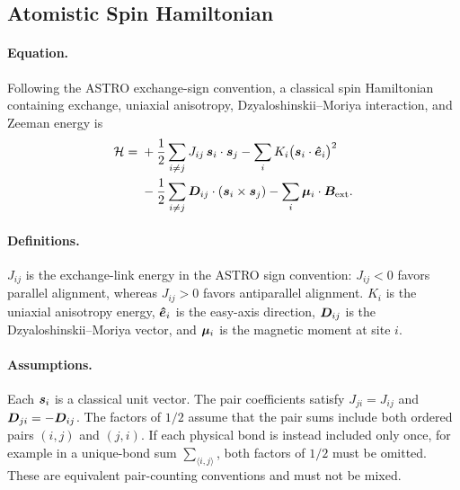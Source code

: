 \subsection{Atomistic Spin Hamiltonian}

\paragraph{Equation.}
Following the ASTRO exchange-sign convention, a classical spin Hamiltonian
containing exchange, uniaxial anisotropy, Dzyaloshinskii--Moriya interaction,
and Zeeman energy is
\begin{align}
    \mathcal{H}
    ={} & +\frac{1}{2}\sum_{i\ne j} J_{ij}\,\bm{s}_i\cdot\bm{s}_j
    -\sum_i K_i\bigl(\bm{s}_i\cdot\bm{\hat{e}}_i\bigr)^2
    \notag                                                      \\
        & -\frac{1}{2}\sum_{i\ne j}
    \bm{D}_{ij}\cdot(\bm{s}_i\times\bm{s}_j)
    -\sum_i \bm{\mu}_i\cdot\bm{B}_{\mathrm{ext}}.
    \label{eq:atomistic-hamiltonian}
\end{align}

\paragraph{Definitions.}
$J_{ij}$ is the exchange-link energy in the ASTRO sign convention: $J_{ij}<0$
favors parallel alignment, whereas $J_{ij}>0$ favors antiparallel alignment.
$K_i$ is the uniaxial anisotropy energy, $\bm{\hat{e}}_i$ is the easy-axis
direction, $\bm{D}_{ij}$ is the Dzyaloshinskii--Moriya vector, and
$\bm{\mu}_i$ is the magnetic moment at site $i$.

\paragraph{Assumptions.}
Each $\bm{s}_i$ is a classical unit vector.  The pair coefficients satisfy
$J_{ji}=J_{ij}$ and $\bm{D}_{ji}=-\bm{D}_{ij}$.  The factors of $1/2$
assume that the pair sums include both ordered pairs $(i,j)$ and $(j,i)$.
If each physical bond is instead included only once, for example in a
unique-bond sum $\sum_{\langle i,j\rangle}$, both factors of $1/2$ must be
omitted.  These are equivalent pair-counting conventions and must not be mixed.

